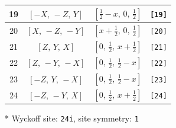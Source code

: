 \documentclass[fleqn,8pt]{jsarticle}
\begin{document}
\begin{longtable}{cccc}
19 & $\left[ - X,\, - Z,\, Y \right]$ & $\left[ \frac{1}{2} - x,\, 0,\, \frac{1}{2} \right]$ & {\tt [19]} \\ \hline
20 & $\left[ X,\, - Z,\, - Y \right]$ & $\left[ x + \frac{1}{2},\, 0,\, \frac{1}{2} \right]$ & {\tt [20]} \\ \hline
21 & $\left[ Z,\, Y,\, X \right]$ & $\left[ 0,\, \frac{1}{2},\, x + \frac{1}{2} \right]$ & {\tt [21]} \\ \hline
22 & $\left[ Z,\, - Y,\, - X \right]$ & $\left[ 0,\, \frac{1}{2},\, \frac{1}{2} - x \right]$ & {\tt [22]} \\ \hline
23 & $\left[ - Z,\, Y,\, - X \right]$ & $\left[ 0,\, \frac{1}{2},\, \frac{1}{2} - x \right]$ & {\tt [23]} \\ \hline
24 & $\left[ - Z,\, - Y,\, X \right]$ & $\left[ 0,\, \frac{1}{2},\, x + \frac{1}{2} \right]$ & {\tt [24]} \\
\end{longtable}
* Wyckoff site: {\tt 24i}, site symmetry: {\tt 1}
\renewcommand{\arraystretch}{1.2}
\end{document}
